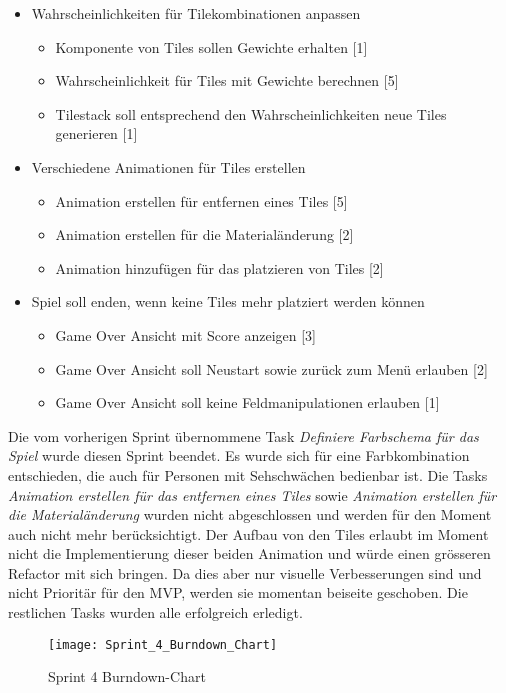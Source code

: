 \documentclass[../main.tex]{subfiles}
\begin{document}
\begin{itemize}
		\item Wahrscheinlichkeiten für Tilekombinationen anpassen
		\begin{itemize}
			\item Komponente von Tiles sollen Gewichte erhalten [1]
			\item Wahrscheinlichkeit für Tiles mit Gewichte berechnen [5]
			\item Tilestack soll entsprechend den Wahrscheinlichkeiten neue Tiles generieren [1]
		\end{itemize}
		
		\item Verschiedene Animationen für Tiles erstellen
		\begin{itemize}
			\item Animation erstellen für entfernen eines Tiles [5]
			\item Animation erstellen für die Materialänderung [2]
			\item Animation hinzufügen für das platzieren von Tiles [2]
		\end{itemize}

		\item Spiel soll enden, wenn keine Tiles mehr platziert werden können
		\begin{itemize}
			\item Game Over Ansicht mit Score anzeigen [3]
			\item Game Over Ansicht soll Neustart sowie zurück zum Menü erlauben [2]
			\item Game Over Ansicht soll keine Feldmanipulationen erlauben [1]
		\end{itemize}
	\end{itemize} 

	\par Die vom vorherigen Sprint übernommene Task \emph{Definiere Farbschema für das Spiel} wurde diesen Sprint beendet. Es wurde sich für eine Farbkombination entschieden, die auch für Personen mit Sehschwächen bedienbar ist. Die Tasks \emph{Animation erstellen für das entfernen eines Tiles} sowie \emph{Animation erstellen für die Materialänderung} wurden nicht abgeschlossen und werden für den Moment auch nicht mehr berücksichtigt. Der Aufbau von den Tiles erlaubt im Moment nicht die Implementierung dieser beiden Animation und würde einen grösseren Refactor mit sich bringen. Da dies aber nur visuelle Verbesserungen sind und nicht Prioritär für den MVP, werden sie momentan beiseite geschoben. Die restlichen Tasks wurden alle erfolgreich erledigt.
	
	\begin{figure}[H]
		\centering
		\texttt{[image: Sprint\_4\_Burndown\_Chart]}
		\caption{Sprint 4 Burndown-Chart}
	\end{figure}
\end{document}
